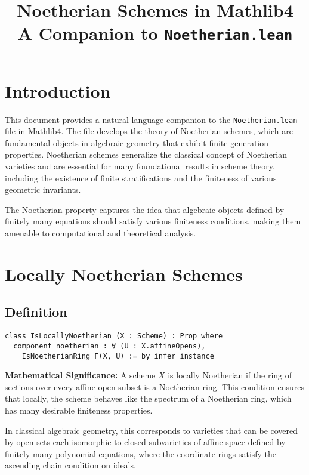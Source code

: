 \documentclass{article}
\title{Noetherian Schemes in Mathlib4\\
\large A Companion to \texttt{Noetherian.lean}}
\author{}
\date{}
\theoremstyle{definition}
\begin{document}
\maketitle

\section{Introduction}

This document provides a natural language companion to the \texttt{Noetherian.lean} file in Mathlib4. The file develops the theory of Noetherian schemes, which are fundamental objects in algebraic geometry that exhibit finite generation properties. Noetherian schemes generalize the classical concept of Noetherian varieties and are essential for many foundational results in scheme theory, including the existence of finite stratifications and the finiteness of various geometric invariants.

The Noetherian property captures the idea that algebraic objects defined by finitely many equations should satisfy various finiteness conditions, making them amenable to computational and theoretical analysis.

\section{Locally Noetherian Schemes}

\subsection{Definition}

\begin{lstlisting}
class IsLocallyNoetherian (X : Scheme) : Prop where
  component_noetherian : ∀ (U : X.affineOpens),
    IsNoetherianRing Γ(X, U) := by infer_instance
\end{lstlisting}

\textbf{Mathematical Significance:} A scheme $X$ is locally Noetherian if the ring of sections over every affine open subset is a Noetherian ring. This condition ensures that locally, the scheme behaves like the spectrum of a Noetherian ring, which has many desirable finiteness properties.

In classical algebraic geometry, this corresponds to varieties that can be covered by open sets each isomorphic to closed subvarieties of affine space defined by finitely many polynomial equations, where the coordinate rings satisfy the ascending chain condition on ideals.
\end{document}
